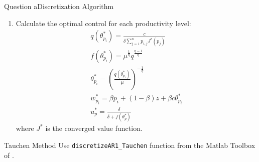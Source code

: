 \documentclass{beamer}
\begin{document}
\begin{frame}[allowframebreaks]{Question a}{Discretization Algorithm}
\begin{enumerate}
\begin{enumerate}
\begin{gather*}
                    J^{(1)}_{p_i} = p_i - w_{p_i} + \delta (1-s)\sum_{j=1}^{n}p_{i,j}J^{(0)}(p_j)
                \end{gather*}
                \item Choose a new grid point for productivity, go through 4.1 to 4.3. Once we have done the update for all productivity grid, we have new system of value function \({V^{(1)}_p}\)
                \item Compute distance between the two systems of value functions following the sup norm \[
                    d = \max\limits_{i\in\{1,\ldots,n\}}|V^{(0)}_i-V^{(1)}_i|\]
                \framebreak
                \item If distance is within the error tolerance level, \(d \leq tol * ||V^{(1)}_1||\), the functions have converged and go to step 5, or else go back to step 4.
            \end{enumerate}
            \item Calculate the optimal control for each productivity level:
            \begin{gather*}
                q(\theta^*_{p_i}) = \frac{c}{\delta \sum_{j=1}^{n}p_{i,j}J^* (p_j)}\\
                f(\theta^*_{p_i}) = \mu^\frac{1}{\eta} q^\frac{\eta-1}{\eta}\\
                \theta^*_{p_i} = (\frac{q(\theta^*_{p_i})}{\mu})^{-\frac{1}{\eta}}\\
                w^*_{p_i} = \beta p_i + (1-\beta)z + \beta c \theta^*_{p_i}\\
                u^*_p = \frac{\delta}{\delta + f(\theta^*_p)}
            \end{gather*}
            where \(J^*\) is the converged value function.
    \end{enumerate}
\end{frame}


\begin{frame}{Tauchen Method}
    Use \texttt{discretizeAR1\_Tauchen} function from the Matlab Toolbox of \cite{Kirkby2023} .
\end{frame}

    
    
\end{document}
